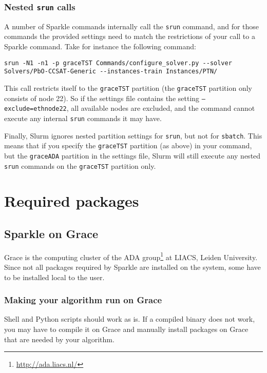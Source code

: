 \documentclass{article}
\begin{document}
\subsubsection{Nested \texttt{srun} calls}
A number of Sparkle commands internally call the \texttt{srun} command, and for those commands the provided settings need to match the restrictions of your call to a Sparkle command. Take for instance the following command:

\begin{lstlisting}[breaklines]
srun -N1 -n1 -p graceTST Commands/configure_solver.py --solver Solvers/PbO-CCSAT-Generic --instances-train Instances/PTN/
\end{lstlisting}

This call restricts itself to the \texttt{graceTST} partition (the \texttt{graceTST} partition only consists of node 22). So if the settings file contains the setting \texttt{--exclude=ethnode22}, all available nodes are excluded, and the command cannot execute any internal \texttt{srun} commands it may have.

Finally, Slurm ignores nested partition settings for \texttt{srun}, but not for \texttt{sbatch}. This means that if you specify the \texttt{graceTST} partition (as above) in your command, but the \texttt{graceADA} partition in the settings file, Slurm will still execute any nested \texttt{srun} commands on the \texttt{graceTST} partition only.

\section{Required packages}

\subsection{Sparkle on Grace}

Grace is the computing cluster of the ADA group\footnote{\url{http://ada.liacs.nl/}} at LIACS, Leiden University. Since not all packages required by Sparkle are installed on the system, some have to be installed local to the user.

\subsubsection{Making your algorithm run on Grace}
\label{solver_grace}

Shell and Python scripts should work as is. If a compiled binary does not work, you may have to compile it on Grace and manually install packages on Grace that are needed by your algorithm.
\end{document}
